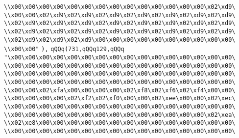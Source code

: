 \verb|\\x00\x00\x00\x00\x00\x00\x00\x00\x00\x00\x00\x00\x00\x00\x02\xd9\|\newline
\verb|\\x00\x00\x02\xd9\x02\xd9\x02\xd9\x02\xd9\x02\xd9\x02\xd9\x02\xd9\|\newline
\verb|\\x02\xd9\x02\xd9\x02\xd9\x02\xd9\x02\xd9\x02\xd9\x02\xd9\x02\xd9\|\newline
\verb|\\x02\xd9\x02\xd9\x02\xd9\x02\xd9\x02\xd9\x02\xd9\x02\xd9\x02\xd9\|\newline
\verb|\\x02\xd9\x02\xd9\x02\xd9\x00\x00\x00\x00\x00\x00\x00\x00\x00\x00\|\newline
\verb|\\x00\x00"|\newline
\verb|),|\newline
\verb|qQQq(731,qQQq129,qQQq|\newline
\verb|"\x00\x00\x00\x00\x00\x00\x00\x00\x00\x00\x00\x00\x00\x00\x00\x00\|\newline
\verb|\\x00\x00\x00\x00\x00\x00\x00\x00\x00\x00\x00\x00\x00\x00\x00\x00\|\newline
\verb|\\x00\x00\x00\x00\x00\x00\x00\x00\x00\x00\x00\x00\x00\x00\x00\x00\|\newline
\verb|\\x00\x00\x00\x00\x00\x00\x00\x00\x00\x00\x00\x00\x00\x00\x00\x00\|\newline
\verb|\\x00\x00\x02\xfa\x00\x00\x00\x00\x02\xf8\x02\xf6\x02\xf4\x00\x00\|\newline
\verb|\\x00\x00\x00\x00\x02\xf2\x02\xf0\x00\x00\x02\xee\x00\x00\x02\xec\|\newline
\verb|\\x00\x00\x00\x00\x00\x00\x00\x00\x00\x00\x00\x00\x00\x00\x00\x00\|\newline
\verb|\\x00\x00\x00\x00\x00\x00\x00\x00\x00\x00\x00\x00\x00\x00\x02\xea\|\newline
\verb|\\x02\xe8\x00\x00\x00\x00\x00\x00\x00\x00\x00\x00\x00\x00\x00\x00\|\newline
\verb|\\x00\x00\x00\x00\x00\x00\x00\x00\x00\x00\x00\x00\x00\x00\x00\x00\|\newline
